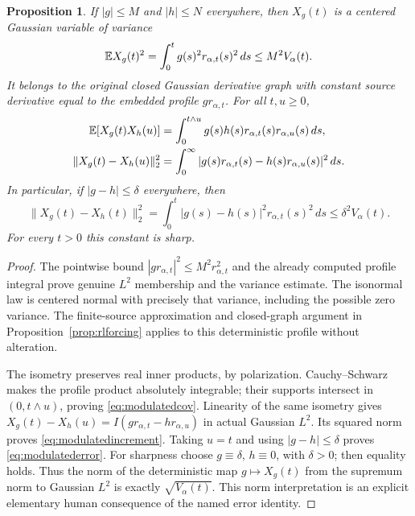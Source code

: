 \documentclass[11pt]{article}
\newtheorem{proposition}[theorem]{Proposition}
\begin{document}
\begin{proposition}\label{prop:modulatedforcing}
If $|g|\leq M$ and $|h|\leq N$ everywhere, then $X_g(t)$ is a
centered Gaussian variable of variance
\[
 \mathbb E X_g(t)^2=\int_0^t g(s)^2 r_{\alpha,t}(s)^2\,ds
                      \leq M^2 V_\alpha(t).
\]
It belongs to the original closed Gaussian derivative graph with
constant source derivative equal to the embedded profile
$g r_{\alpha,t}$. For all $t,u\geq0$,
\begin{align}
 \mathbb E[X_g(t)X_h(u)]
  &=\int_0^{t\wedge u}g(s)h(s)r_{\alpha,t}(s)r_{\alpha,u}(s)\,ds,
       \label{eq:modulatedcov}\\
 \|X_g(t)-X_h(u)\|_2^2
  &=\int_0^\infty
           |g(s)r_{\alpha,t}(s)-h(s)r_{\alpha,u}(s)|^2\,ds.
       \label{eq:modulatedincrement}
\end{align}
In particular, if $|g-h|\leq\delta$ everywhere, then
\begin{equation}\label{eq:modulatederror}
 \|X_g(t)-X_h(t)\|_2^2
   =\int_0^t|g(s)-h(s)|^2r_{\alpha,t}(s)^2\,ds
   \leq\delta^2 V_\alpha(t).
\end{equation}
For every $t>0$ this constant is sharp.
\end{proposition}
\begin{proof}
The pointwise bound $|g r_{\alpha,t}|^2\leq M^2r_{\alpha,t}^2$
and the already computed profile integral prove genuine $L^2$
membership and the variance estimate. The isonormal law is centered
normal with precisely that variance, including the possible zero
variance. The finite-source approximation and closed-graph argument
in Proposition~\ref{prop:rlforcing} applies to this deterministic
profile without alteration.

The isometry preserves real inner products, by polarization.
Cauchy--Schwarz makes the profile product absolutely integrable;
their supports intersect in $(0,t\wedge u)$, proving
\eqref{eq:modulatedcov}. Linearity of the same isometry gives
$X_g(t)-X_h(u)=I(g r_{\alpha,t}-h r_{\alpha,u})$ in actual
Gaussian $L^2$. Its squared norm proves
\eqref{eq:modulatedincrement}. Taking $u=t$ and using
$|g-h|\leq\delta$ proves \eqref{eq:modulatederror}.
For sharpness choose $g\equiv\delta$, $h\equiv0$, with $\delta>0$;
then equality holds. Thus the norm of the deterministic map
$g\mapsto X_g(t)$ from the supremum norm to Gaussian $L^2$ is
exactly $\sqrt{V_\alpha(t)}$. This norm interpretation is an
explicit elementary human consequence of the named error identity.
\end{proof}
\end{document}
